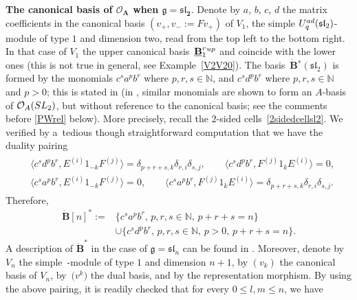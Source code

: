 \documentclass[11pt]{article}
\numberwithin{equation}{section}
\numberwithin{equation}{section}
\theoremstyle{definition}
\newcommand{\mn}{\mathbb{N}}
\newcommand{\Oo}{{\mathcal O}}
\begin{document}
{\bf The canonical basis of $\boldsymbol{\Oo_A}$ when $\boldsymbol{\mathfrak{g}={\mathfrak{sl}_2}}$}. Denote by $a$, $b$, $c$, $d$ the matrix coefficients in the canonical basis $(v_+,v_-:=Fv_+)$ of $V_1$, the simple $U_q^{\rm ad}({\mathfrak{sl}_2})$-module of type $1$ and dimension two, read from the top left to the bottom right. In that case of $V_1$ the upper canonical basis~$\underline{\mathbf{B}}_{1}^r{}^{\rm up}$ and  coincide with the lower ones (this is not true in general, see Example~\ref{V2V20}). The basis~$\dot{\mathbf{B}} {}^*({\mathfrak{sl}_2})$ is formed by the monomials $c^sa^pb^r$ where $p,r,s\in \mn$, and $c^sd^pb^r$ where $p,r,s\in \mn$ and $p>0$; this is stated in \cite[Proposition~9.1.1]{Kashiwara2} (in \cite[Proposition~1.3]{DC-L}, similar monomials are shown to form an $A$-basis of $\Oo_A({\rm SL}_2)$, but without reference to the canonical basis; see the comments before \eqref{PWrel} below). More precisely, recall the $2$-sided cells~\eqref{2sidedcellsl2}. We verified by a~tedious though straightforward computation that we have the duality pairing
\begin{gather*}
\begin{split}
& \big\langle c^sd^pb^r, E^{(i)}1_{-k}F^{(j)} \big\rangle = \delta_{p+r+s,k}\delta_{r,i}\delta_{s,j} ,\qquad \big\langle c^sd^pb^r, F^{(j)}1_{k}E^{(i)} \big\rangle =0, \\
& \big\langle c^sa^pb^r, E^{(i)}1_{-k}F^{(j)} \big\rangle = 0 ,\qquad \big\langle c^sa^pb^r, F^{(j)}1_{k}E^{(i)} \big\rangle =\delta_{p+r+s,k}\delta_{r,i}\delta_{s,j}.
\end{split}
\end{gather*}
Therefore, \begin{align*}\dot{\mathbf{B}} [n]^* :={}& \{ c^sa^pb^r, \, p,r,s\in \mn,\, p+r+s=n\} \\&\cup \{ c^{s}d^{p}b^{r},\, p,r,s\in \mn,\, p>0,\, p+r+s=n\}.\end{align*}
A description of $\dot{\mathbf{B}}^*$ in the case of $\mathfrak{g} = {\mathfrak{sl}_n}$ can be found in \cite{Du}. Moreover, denote by $V_n$ the simple~-module of type $1$ and dimension $n+1$, by $(v_k)$ the canonical basis of $V_n$, by~$\big(v^k\big)$ the dual basis, and by  the representation morphism. By using the above pairing, it is readily checked that for every $0\leq l,m\leq n$, we have
\end{document}
